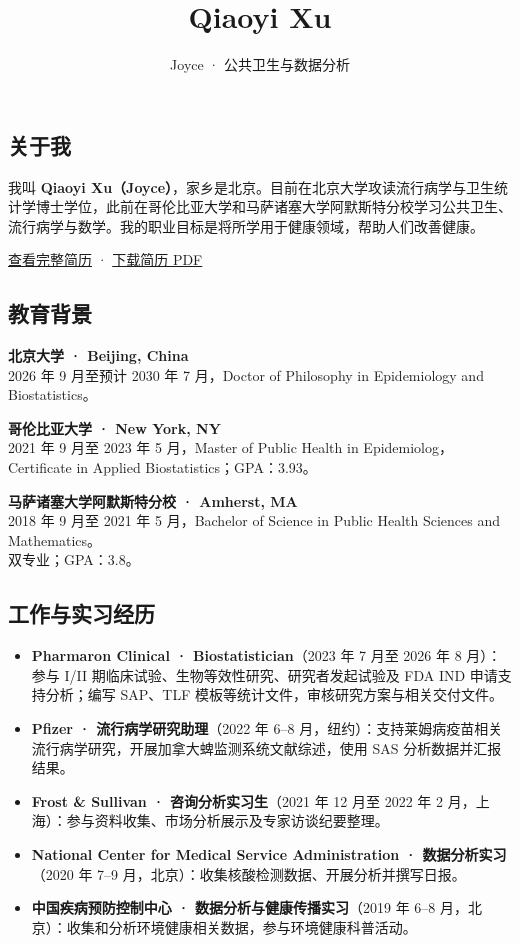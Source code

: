 \documentclass[
  10pt,
  UTF8,
  fontset=fandol]{ctexart}
\title{Qiaoyi Xu}
\subtitle{Joyce · 公共卫生与数据分析}
\author{}
\date{}
\providecommand{\tightlist}{%
  \setlength{\itemsep}{0pt}\setlength{\parskip}{0pt}}\usepackage{longtable,booktabs,array}
\begin{document}
\maketitle


\subsection{关于我}\label{about}

我叫 \textbf{Qiaoyi
Xu（Joyce）}，家乡是北京。目前在北京大学攻读流行病学与卫生统计学博士学位，此前在哥伦比亚大学和马萨诸塞大学阿默斯特分校学习公共卫生、流行病学与数学。我的职业目标是将所学用于健康领域，帮助人们改善健康。

\href{myresume.html}{查看完整简历} · \href{myresume.pdf}{下载简历 PDF}

\subsection{教育背景}\label{education}

\textbf{北京大学 · Beijing, China}\\
2026 年 9 月至预计 2030 年 7 月，Doctor of Philosophy in Epidemiology
and Biostatistics。

\textbf{哥伦比亚大学 · New York, NY}\\
2021 年 9 月至 2023 年 5 月，Master of Public Health in
Epidemiolog，Certificate in Applied Biostatistics；GPA：3.93。

\textbf{马萨诸塞大学阿默斯特分校 · Amherst, MA}\\
2018 年 9 月至 2021 年 5 月，Bachelor of Science in Public Health
Sciences and Mathematics。\\
双专业；GPA：3.8。

\subsection{工作与实习经历}\label{experience}

\begin{itemize}
\tightlist
\item
  \textbf{Pharmaron Clinical · Biostatistician}（2023 年 7 月至 2026 年
  8 月）：参与 I/II 期临床试验、生物等效性研究、研究者发起试验及 FDA IND
  申请支持分析；编写 SAP、TLF
  模板等统计文件，审核研究方案与相关交付文件。
\item
  \textbf{Pfizer · 流行病学研究助理}（2022 年 6--8
  月，纽约）：支持莱姆病疫苗相关流行病学研究，开展加拿大蜱监测系统文献综述，使用
  SAS 分析数据并汇报结果。
\item
  \textbf{Frost \& Sullivan · 咨询分析实习生}（2021 年 12 月至 2022 年 2
  月，上海）：参与资料收集、市场分析展示及专家访谈纪要整理。
\item
  \textbf{National Center for Medical Service Administration ·
  数据分析实习}（2020 年 7--9
  月，北京）：收集核酸检测数据、开展分析并撰写日报。
\item
  \textbf{中国疾病预防控制中心 · 数据分析与健康传播实习}（2019 年 6--8
  月，北京）：收集和分析环境健康相关数据，参与环境健康科普活动。
\end{itemize}
\end{document}
